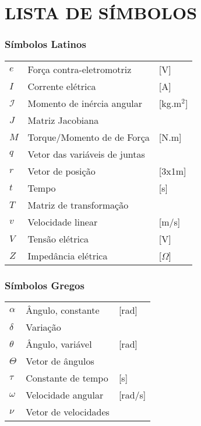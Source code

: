 




\chapter*{LISTA DE SÍMBOLOS}




\subsection*{Símbolos Latinos}

\begin{tabular}{p{}p{}>{\PreserveBacklash\raggedleft}p{}}
$e$             & Força contra-eletromotriz     & {[}V{]}           \tabularnewline    
$I$             & Corrente elétrica             & {[}A{]}           \tabularnewline 
$\mathcal{I}$   & Momento de inércia angular    & {[}kg.m$^2${]}    \tabularnewline
$J$             & Matriz Jacobiana              &                   \tabularnewline
$M$             & Torque/Momento de de Força    & {[}N.m{]}         \tabularnewline
$q$             & Vetor das variáveis de juntas &                   \tabularnewline
$r$             & Vetor de posição              & {[}3x1m{]}        \tabularnewline
$t$             & Tempo                         & {[}s{]}           \tabularnewline
$T$             & Matriz de transformação       &                   \tabularnewline
$v$             & Velocidade linear             & {[}m/s{]}         \tabularnewline
$V$             & Tensão elétrica               & {[}V{]}           \tabularnewline
$Z$             & Impedância elétrica           & {[}$\Omega${]}    \tabularnewline 
\end{tabular}


\subsection*{Símbolos Gregos}

\begin{tabular}{p{}p{}>{\PreserveBacklash\raggedleft}p{}}
$\alpha$    & Ângulo, constante         & {[}rad{]}     \tabularnewline
$\delta$    & Variação                  &               \tabularnewline
$\theta$    & Ângulo, variável          & {[}rad{]}     \tabularnewline
$\Theta$    & Vetor de ângulos          &               \tabularnewline
$\tau$      & Constante de tempo        & {[}s{]}       \tabularnewline
$\omega$    & Velocidade angular        & {[}rad/s{]}   \tabularnewline
$\nu$       & Vetor de velocidades      &               \tabularnewline
\end{tabular}


